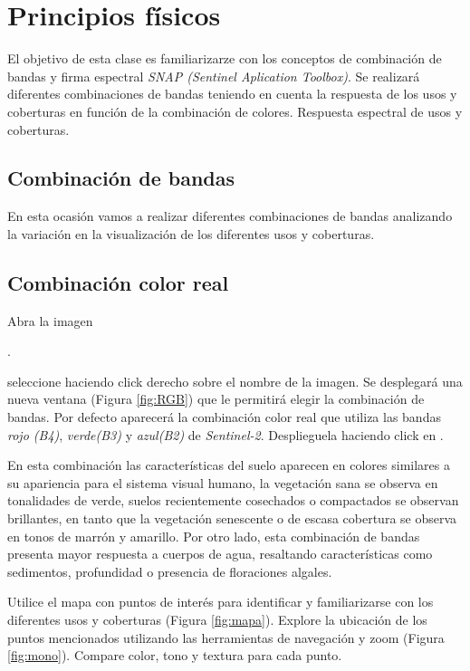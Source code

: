 \chapter{Principios físicos}

El objetivo de esta clase es familiarizarze con los conceptos de combinación de bandas y firma espectral \emph{SNAP (Sentinel Aplication Toolbox)}. Se realizará diferentes combinaciones de bandas teniendo en cuenta la respuesta de los usos y coberturas en función de la combinación de colores. Respuesta espectral de usos y coberturas.





\section{Combinación de bandas}
En esta ocasión vamos a realizar diferentes combinaciones de bandas analizando la variación en la visualización de los diferentes usos y coberturas. 


\section{Combinación color real}\label{sec:colorreal}

Abra la imagen \begin{center} .
\end{center} seleccione  haciendo click derecho sobre el nombre de la imagen. Se desplegará una nueva ventana (Figura \ref{fig:RGB}) que le permitirá elegir la combinación de bandas. Por defecto aparecerá la combinación color real que utiliza las bandas \emph{rojo (B4)}, \emph{verde(B3)} y \emph{azul(B2)} de \emph{Sentinel-2}. Desplieguela haciendo click en . 

En esta combinación las características del suelo aparecen en colores similares a su apariencia para el sistema visual humano, la vegetación sana se observa en tonalidades de verde, suelos recientemente cosechados o compactados se observan brillantes, en tanto que la vegetación senescente o de escasa cobertura se observa en tonos de marrón y amarillo. Por otro lado, esta combinación de bandas presenta mayor respuesta a cuerpos de agua, resaltando características como sedimentos, profundidad o presencia de floraciones algales. 

Utilice el mapa con puntos de interés para identificar y familiarizarse con los diferentes usos y coberturas (Figura \ref{fig:mapa}). Explore la ubicación de los puntos mencionados utilizando las herramientas de navegación y zoom  (Figura \ref{fig:mono}). Compare color, tono y textura para cada punto. 


